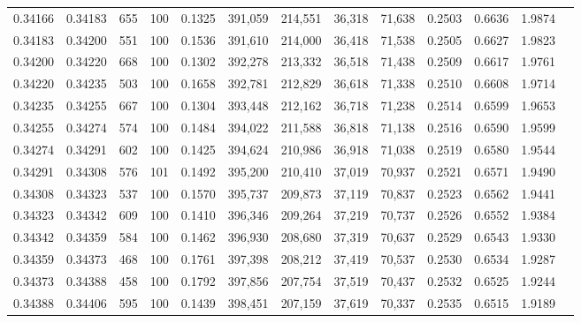 \begin{tabular}{rrrrrrrrrrrrr}
0.34166 & 0.34183 &   655 & 100 &                                     0.1325 & 391,059 & 214,551 &  36,318 &  71,638 & 0.2503 & 0.6636 & 1.9874 \\
0.34183 & 0.34200 &   551 & 100 &                                     0.1536 & 391,610 & 214,000 &  36,418 &  71,538 & 0.2505 & 0.6627 & 1.9823 \\
0.34200 & 0.34220 &   668 & 100 &                                     0.1302 & 392,278 & 213,332 &  36,518 &  71,438 & 0.2509 & 0.6617 & 1.9761 \\
0.34220 & 0.34235 &   503 & 100 &                                     0.1658 & 392,781 & 212,829 &  36,618 &  71,338 & 0.2510 & 0.6608 & 1.9714 \\
0.34235 & 0.34255 &   667 & 100 &                                     0.1304 & 393,448 & 212,162 &  36,718 &  71,238 & 0.2514 & 0.6599 & 1.9653 \\
0.34255 & 0.34274 &   574 & 100 &                                     0.1484 & 394,022 & 211,588 &  36,818 &  71,138 & 0.2516 & 0.6590 & 1.9599 \\
0.34274 & 0.34291 &   602 & 100 &                                     0.1425 & 394,624 & 210,986 &  36,918 &  71,038 & 0.2519 & 0.6580 & 1.9544 \\
0.34291 & 0.34308 &   576 & 101 &                                     0.1492 & 395,200 & 210,410 &  37,019 &  70,937 & 0.2521 & 0.6571 & 1.9490 \\
0.34308 & 0.34323 &   537 & 100 &                                     0.1570 & 395,737 & 209,873 &  37,119 &  70,837 & 0.2523 & 0.6562 & 1.9441 \\
0.34323 & 0.34342 &   609 & 100 &                                     0.1410 & 396,346 & 209,264 &  37,219 &  70,737 & 0.2526 & 0.6552 & 1.9384 \\
0.34342 & 0.34359 &   584 & 100 &                                     0.1462 & 396,930 & 208,680 &  37,319 &  70,637 & 0.2529 & 0.6543 & 1.9330 \\
0.34359 & 0.34373 &   468 & 100 &                                     0.1761 & 397,398 & 208,212 &  37,419 &  70,537 & 0.2530 & 0.6534 & 1.9287 \\
0.34373 & 0.34388 &   458 & 100 &                                     0.1792 & 397,856 & 207,754 &  37,519 &  70,437 & 0.2532 & 0.6525 & 1.9244 \\
0.34388 & 0.34406 &   595 & 100 &                                     0.1439 & 398,451 & 207,159 &  37,619 &  70,337 & 0.2535 & 0.6515 & 1.9189 \\

\end{tabular}
